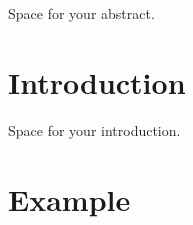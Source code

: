 \documentclass[a4paper,oneside,10pt,ngerman,english]{scrartcl}
\begin{document}


\maketitle


\cleardoubleoddpage
\tableofcontents




\cleardoubleoddpage


Space for your abstract.




\cleardoubleoddpage

\section{Introduction}
\label{sec:introduction}

Space for your introduction.


\section{Example}
\label{sec:example}
\end{document}
